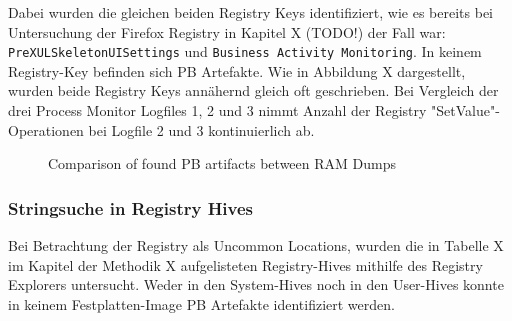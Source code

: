 \begin{appendices}
Dabei wurden die gleichen beiden Registry Keys identifiziert, wie es bereits bei Untersuchung der Firefox Registry in Kapitel X (TODO!) der Fall war: \texttt{PreXULSkeletonUISettings} und \texttt{Business Activity Monitoring}. In keinem Registry-Key befinden sich PB Artefakte.
Wie in Abbildung X dargestellt, wurden beide Registry Keys annähernd gleich oft geschrieben. Bei Vergleich der drei Process Monitor Logfiles 1, 2 und 3 nimmt Anzahl der Registry "SetValue"-Operationen bei Logfile 2 und 3 kontinuierlich ab.
\begin{figure}[h!]
	\centerline{}
	\label{chart:final-criteria}  
	\caption{Comparison of found PB artifacts between RAM Dumps}
\end{figure}

\subsubsection*{Stringsuche in Registry Hives}
Bei Betrachtung der Registry als Uncommon Locations, wurden die in Tabelle X im Kapitel der Methodik X aufgelisteten Registry-Hives mithilfe des Registry Explorers untersucht. 
Weder in den System-Hives noch in den User-Hives konnte in keinem Festplatten-Image PB Artefakte identifiziert werden. 



	
\end{appendices}